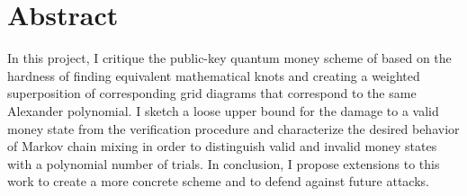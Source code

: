 \section{Abstract}

In this project, I critique the public-key quantum money scheme of
\cite{Farhi2010} based on the hardness of finding equivalent
mathematical knots and creating a weighted superposition of
corresponding grid diagrams that correspond to the same Alexander
polynomial.
I sketch a loose upper bound for the damage to a valid
money state from the verification procedure and characterize the
desired behavior of Markov chain mixing in order to distinguish
valid and invalid money states with a polynomial number of trials.
In conclusion, I propose extensions to this work to create
a more concrete scheme and to defend against future attacks.